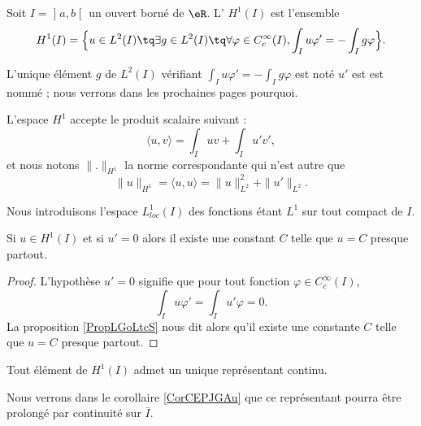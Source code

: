 \begin{definition}
    Soit \( I=\mathopen] a , b \mathclose[\) un ouvert borné de \( \eR\). L' \( H^1(I)\) est l'ensemble
    \begin{equation}
        H^1(I)=\Big\{   u\in L^2(I)\tq\exists g\in L^2(I)\tq\forall \varphi\in  C^{\infty}_c(I),\int_Iu\varphi'=-\int_Ig\varphi   \Big\}.
    \end{equation}
\end{definition}
 
L'unique élément \( g\) de \( L^2(I)\) vérifiant \( \int_Iu\varphi'=-\int_Ig\varphi\) est noté \( u'\) est est nommé ; nous verrons dans les prochaines pages pourquoi.

L'espace \( H^1\) accepte le produit scalaire suivant :
\begin{equation}
    \langle u, v\rangle =\int_Iuv+\int_Iu'v',
\end{equation}
et nous notons \( \| . \|_{H^1}\) la norme correspondante qui n'est autre que
\begin{equation}
    \| u \|_{H^1}=\langle u, u\rangle =\| u \|^2_{L^2}+\| u' \|_{L^2}.
\end{equation}

Nous introduisons l'espace \( L^1_{loc}(I)\) des fonctions étant \( L^1\) sur tout compact de \( I\). 

\begin{corollary}   \label{CorEVJYihj}
    Si \( u\in H^1(I)\) et si \( u'=0\) alors il existe une constant \( C\) telle que \( u=C\) presque partout.
\end{corollary}

\begin{proof}
    L'hypothèse \( u'=0\) signifie que pour tout fonction \( \varphi\in C^{\infty}_c(I)\),
    \begin{equation}
        \int_Iu\varphi'=\int_Iu'\varphi=0.
    \end{equation}
    La proposition \ref{PropLGoLtcS} nous dit alors qu'il existe une constante \( C\) telle que \( u=C\) presque partout.
\end{proof}

\begin{lemma}   \label{LemMPkbZxX}
    Tout élément de \( H^1(I)\) admet un unique représentant continu.
\end{lemma}
Nous verrons dans le corollaire \ref{CorCEPJGAu} que ce représentant pourra être prolongé par continuité sur \( \bar I\).

